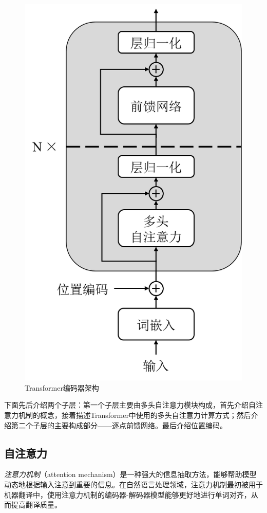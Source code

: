 \begin{figure}[htb]
	\centering
	\includegraphics[scale=0.55]{tf.png}
	\caption{Transformer编码器架构}
	\label{fig:tf_encoder}
\end{figure}

下面先后介绍两个子层：第一个子层主要由多头自注意力模块构成，首先介绍自注意力机制的概念，接着描述Transformer中使用的多头自注意力计算方式；然后介绍第二个子层的主要构成部分——逐点前馈网络。最后介绍位置编码。

\subsection{自注意力}
\emph{注意力机制}（attention mechanism）是一种强大的信息抽取方法，能够帮助模型动态地根据输入注意到重要的信息。在自然语言处理领域，注意力机制最初被用于机器翻译中\cite{DBLP:journals/corr/BahdanauCB14}，使用注意力机制的编码器-解码器模型能够更好地进行单词对齐，从而提高翻译质量。

